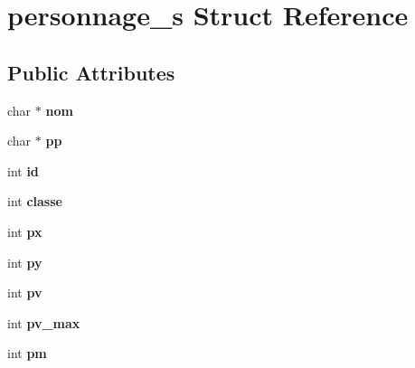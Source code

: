 \hypertarget{structpersonnage__s}{}\section{personnage\+\_\+s Struct Reference}
\label{structpersonnage__s}
\subsection*{Public Attributes}
\begin{DoxyCompactItemize}
\item 
\mbox{\label{structpersonnage__s_ac0fc9fa7fa00b5d1e1ba1ad3a424cef3}} 
char $\ast$ {\bfseries nom}
\item 
\mbox{\label{structpersonnage__s_a7aaaa899a653a1f2ab3566e5bd6a1a42}} 
char $\ast$ {\bfseries pp}
\item 
\mbox{\label{structpersonnage__s_a07d07848be2033ea8b7eba44e778a2e9}} 
int {\bfseries id}
\item 
\mbox{\label{structpersonnage__s_a36ab571d28910458a8da6782ca44e2cb}} 
int {\bfseries classe}
\item 
\mbox{\label{structpersonnage__s_a4e2d1933481c1e77efe9278329a12f8a}} 
int {\bfseries px}
\item 
\mbox{\label{structpersonnage__s_a0d86eecefc9e77513725ffa84e272f31}} 
int {\bfseries py}
\item 
\mbox{\label{structpersonnage__s_ab3090d9110756af454516f939e9f8a86}} 
int {\bfseries pv}
\item 
\mbox{\label{structpersonnage__s_a0e58c8761de9044ce770f21aa9ada41a}} 
int {\bfseries pv\+\_\+max}
\item 
\mbox{\label{structpersonnage__s_ac9cb52498ece1786895b2c23275f5298}} 
int {\bfseries pm}
\item 
\mbox{\label{structpersonnage__s_a439bf5dfed4865619493cc5b68f8c98f}} 

\end{DoxyCompactItemize}
